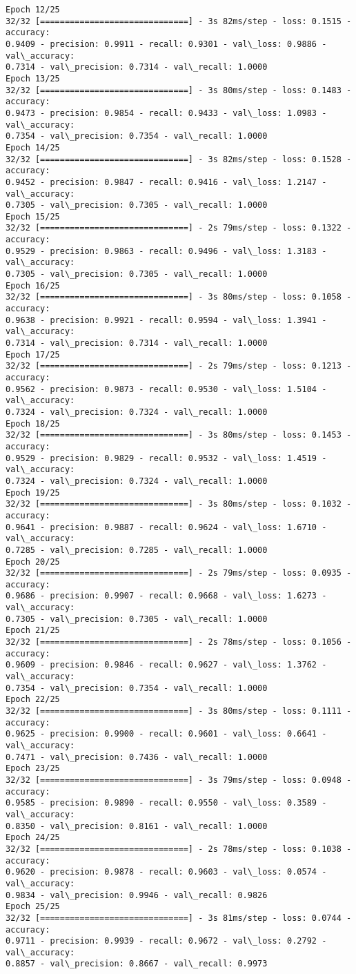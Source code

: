 \documentclass[11pt]{article}
\begin{document}
\begin{Verbatim}[commandchars=\\\{\}]
Epoch 12/25
32/32 [==============================] - 3s 82ms/step - loss: 0.1515 - accuracy:
0.9409 - precision: 0.9911 - recall: 0.9301 - val\_loss: 0.9886 - val\_accuracy:
0.7314 - val\_precision: 0.7314 - val\_recall: 1.0000
Epoch 13/25
32/32 [==============================] - 3s 80ms/step - loss: 0.1483 - accuracy:
0.9473 - precision: 0.9854 - recall: 0.9433 - val\_loss: 1.0983 - val\_accuracy:
0.7354 - val\_precision: 0.7354 - val\_recall: 1.0000
Epoch 14/25
32/32 [==============================] - 3s 82ms/step - loss: 0.1528 - accuracy:
0.9452 - precision: 0.9847 - recall: 0.9416 - val\_loss: 1.2147 - val\_accuracy:
0.7305 - val\_precision: 0.7305 - val\_recall: 1.0000
Epoch 15/25
32/32 [==============================] - 2s 79ms/step - loss: 0.1322 - accuracy:
0.9529 - precision: 0.9863 - recall: 0.9496 - val\_loss: 1.3183 - val\_accuracy:
0.7305 - val\_precision: 0.7305 - val\_recall: 1.0000
Epoch 16/25
32/32 [==============================] - 3s 80ms/step - loss: 0.1058 - accuracy:
0.9638 - precision: 0.9921 - recall: 0.9594 - val\_loss: 1.3941 - val\_accuracy:
0.7314 - val\_precision: 0.7314 - val\_recall: 1.0000
Epoch 17/25
32/32 [==============================] - 2s 79ms/step - loss: 0.1213 - accuracy:
0.9562 - precision: 0.9873 - recall: 0.9530 - val\_loss: 1.5104 - val\_accuracy:
0.7324 - val\_precision: 0.7324 - val\_recall: 1.0000
Epoch 18/25
32/32 [==============================] - 3s 80ms/step - loss: 0.1453 - accuracy:
0.9529 - precision: 0.9829 - recall: 0.9532 - val\_loss: 1.4519 - val\_accuracy:
0.7324 - val\_precision: 0.7324 - val\_recall: 1.0000
Epoch 19/25
32/32 [==============================] - 3s 80ms/step - loss: 0.1032 - accuracy:
0.9641 - precision: 0.9887 - recall: 0.9624 - val\_loss: 1.6710 - val\_accuracy:
0.7285 - val\_precision: 0.7285 - val\_recall: 1.0000
Epoch 20/25
32/32 [==============================] - 2s 79ms/step - loss: 0.0935 - accuracy:
0.9686 - precision: 0.9907 - recall: 0.9668 - val\_loss: 1.6273 - val\_accuracy:
0.7305 - val\_precision: 0.7305 - val\_recall: 1.0000
Epoch 21/25
32/32 [==============================] - 2s 78ms/step - loss: 0.1056 - accuracy:
0.9609 - precision: 0.9846 - recall: 0.9627 - val\_loss: 1.3762 - val\_accuracy:
0.7354 - val\_precision: 0.7354 - val\_recall: 1.0000
Epoch 22/25
32/32 [==============================] - 3s 80ms/step - loss: 0.1111 - accuracy:
0.9625 - precision: 0.9900 - recall: 0.9601 - val\_loss: 0.6641 - val\_accuracy:
0.7471 - val\_precision: 0.7436 - val\_recall: 1.0000
Epoch 23/25
32/32 [==============================] - 3s 79ms/step - loss: 0.0948 - accuracy:
0.9585 - precision: 0.9890 - recall: 0.9550 - val\_loss: 0.3589 - val\_accuracy:
0.8350 - val\_precision: 0.8161 - val\_recall: 1.0000
Epoch 24/25
32/32 [==============================] - 2s 78ms/step - loss: 0.1038 - accuracy:
0.9620 - precision: 0.9878 - recall: 0.9603 - val\_loss: 0.0574 - val\_accuracy:
0.9834 - val\_precision: 0.9946 - val\_recall: 0.9826
Epoch 25/25
32/32 [==============================] - 3s 81ms/step - loss: 0.0744 - accuracy:
0.9711 - precision: 0.9939 - recall: 0.9672 - val\_loss: 0.2792 - val\_accuracy:
0.8857 - val\_precision: 0.8667 - val\_recall: 0.9973
    \end{Verbatim}
\end{document}
